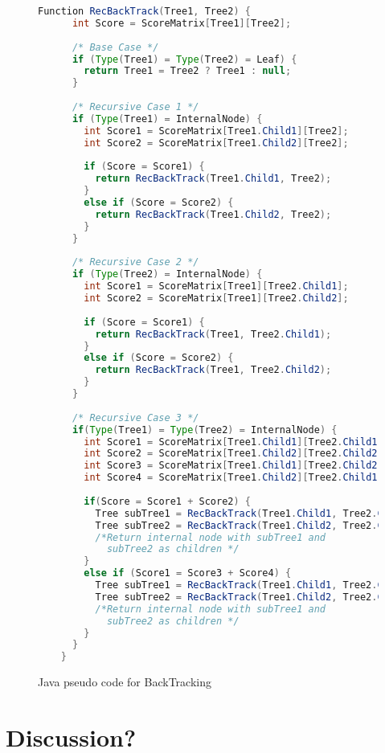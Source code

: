 \begin{figure}
	\begin{lstlisting}[language=Java]
	Function RecBackTrack(Tree1, Tree2)	{
	  int Score = ScoreMatrix[Tree1][Tree2];
	  
	  /* Base Case */
	  if (Type(Tree1) = Type(Tree2) = Leaf) {
	    return Tree1 = Tree2 ? Tree1 : null; 
	  }
	  
	  /* Recursive Case 1 */
	  if (Type(Tree1) = InternalNode) {
	    int Score1 = ScoreMatrix[Tree1.Child1][Tree2]; 
	    int Score2 = ScoreMatrix[Tree1.Child2][Tree2];
	  
	    if (Score = Score1) {
	      return RecBackTrack(Tree1.Child1, Tree2);
	    }
	    else if (Score = Score2) {
	      return RecBackTrack(Tree1.Child2, Tree2);
	    }
	  }
	  
	  /* Recursive Case 2 */
	  if (Type(Tree2) = InternalNode) {
	    int Score1 = ScoreMatrix[Tree1][Tree2.Child1]; 
	    int Score2 = ScoreMatrix[Tree1][Tree2.Child2];
	  
	    if (Score = Score1) {
	      return RecBackTrack(Tree1, Tree2.Child1);
	    }
	    else if (Score = Score2) {
	      return RecBackTrack(Tree1, Tree2.Child2);
	    }
	  }	
	  
	  /* Recursive Case 3 */
	  if(Type(Tree1) = Type(Tree2) = InternalNode) {
	    int Score1 = ScoreMatrix[Tree1.Child1][Tree2.Child1];
	    int Score2 = ScoreMatrix[Tree1.Child2][Tree2.Child2];
	    int Score3 = ScoreMatrix[Tree1.Child1][Tree2.Child2];
	    int Score4 = ScoreMatrix[Tree1.Child2][Tree2.Child1];
	
	    if(Score = Score1 + Score2) {
	      Tree subTree1 = RecBackTrack(Tree1.Child1, Tree2.Child1);
	      Tree subTree2 = RecBackTrack(Tree1.Child2, Tree2.Child2);
	      /*Return internal node with subTree1 and 
	        subTree2 as children */
	    }
	    else if (Score1 = Score3 + Score4) {
	      Tree subTree1 = RecBackTrack(Tree1.Child1, Tree2.Child2);
          Tree subTree2 = RecBackTrack(Tree1.Child2, Tree2.Child1);
	      /*Return internal node with subTree1 and 
	        subTree2 as children */
	    }
	  }
	}
	\end{lstlisting}
	\caption{Java pseudo code for BackTracking}
	\label{Code:Backtracking1}
\end{figure}	


  




\section{Discussion?}

